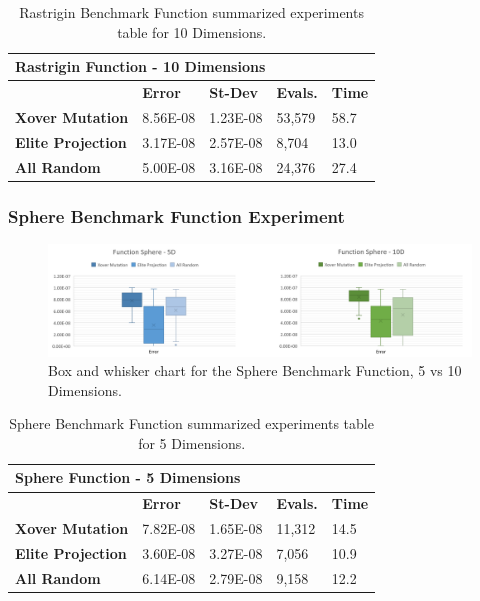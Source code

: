 \documentclass[graybox]{svmult}
\begin{document}
\begin{table}[]
    \scriptsize
    \centering
    \caption{Rastrigin Benchmark Function summarized experiments table for 10 Dimensions.}\label{tab.fun_rastrigin10}
    \begin{tabular}{@{}lllll@{}}
    \toprule
    \multicolumn{5}{l}{\textbf{Rastrigin Function - 10   Dimensions}} \\ \midrule
     & \textbf{Error} & \textbf{St-Dev} & \textbf{Evals.} & \textbf{Time} \\
    \textbf{Xover Mutation} & 8.56E-08 & 1.23E-08 & 53,579 & 58.7 \\
    \textbf{Elite Projection} & 3.17E-08 & 2.57E-08 & 8,704 & 13.0 \\
    \textbf{All Random} & 5.00E-08 & 3.16E-08 & 24,376 & 27.4 \\ \bottomrule
    \end{tabular}
    \end{table}


\subsubsection{Sphere Benchmark Function Experiment}

\begin{figure}
    \includegraphics[width=\textwidth]{img/fig_fun_sphere.pdf}
    \caption{Box and whisker chart for the Sphere Benchmark Function, 5 vs 10 Dimensions.} \label{fig.fun_sphere}
    \end{figure}

\begin{table}[]
    \scriptsize
    \centering
    \caption{Sphere Benchmark Function summarized experiments table for 5 Dimensions.}\label{tab.fun_sphere5}
    \begin{tabular}{@{}lllll@{}}
    \toprule
    \multicolumn{5}{l}{\textbf{Sphere Function - 5 Dimensions}} \\ \midrule
     & \textbf{Error} & \textbf{St-Dev} & \textbf{Evals.} & \textbf{Time} \\
    \textbf{Xover Mutation} & 7.82E-08 & 1.65E-08 & 11,312 & 14.5 \\
    \textbf{Elite Projection} & 3.60E-08 & 3.27E-08 & 7,056 & 10.9 \\
    \textbf{All Random} & 6.14E-08 & 2.79E-08 & 9,158 & 12.2 \\ \bottomrule
    \end{tabular}
    \end{table}
\end{document}

